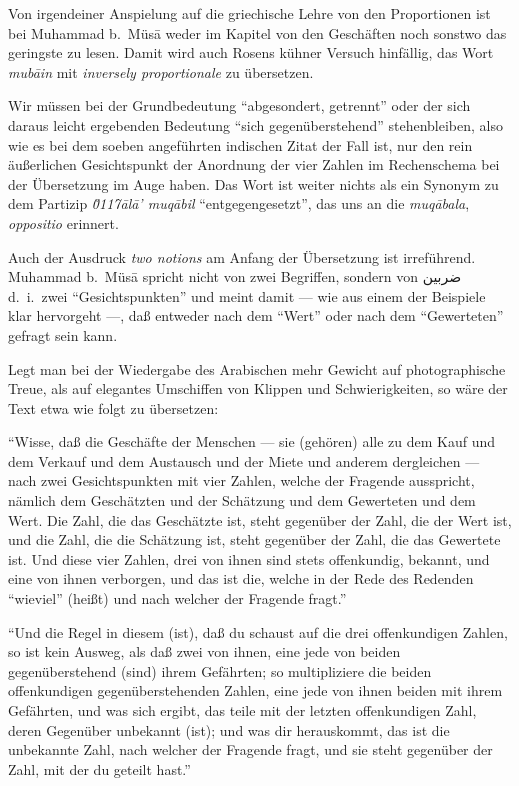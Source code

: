\documentclass[11pt,a4paper]{article}
\newcommand{\RL}[1]{\beginR#1\endR}
\newcommand{\ar}[1]{{\arabicfont\RL{#1}}}
\newcommand{\enquote}[1]{``#1''}
\begin{document}
Von irgendeiner Anspielung auf die griechische Lehre von den Proportionen ist bei Muhammad b.\ M\"us\=a weder im Kapitel von den Gesch\"aften noch sonstwo das geringste zu lesen. Damit wird auch Rosens k\"uhner Versuch hinf\"allig, das Wort \textit{mub\=ain} mit \textit{inversely proportionale} zu \"ubersetzen.

Wir m\"ussen bei der Grundbedeutung \enquote{abgesondert, getrennt} oder der sich daraus leicht ergebenden Bedeutung \enquote{sich gegen\"uberstehend} stehenbleiben, also wie es bei dem soeben angef\"uhrten indischen Zitat der Fall ist, nur den rein \"au\ss{}erlichen Gesichtspunkt der Anordnung der vier Zahlen im Rechenschema bei der \"Ubersetzung im Auge haben. Das Wort ist weiter nichts als ein Synonym zu dem Partizip \textit{\u0117\=al\=a' muq\=abil} \enquote{entgegengesetzt}, das uns an die \textit{muq\=abala}, \textit{oppositio} erinnert.

Auch der Ausdruck \textit{two notions} am Anfang der \"Ubersetzung ist irref\"uhrend. Muhammad b.\ M\"us\=a spricht nicht von zwei Begriffen, sondern von \ar{ضربين} d.\ i.\ zwei \enquote{Gesichtspunkten} und meint damit --- wie aus einem der Beispiele klar hervorgeht ---, da\ss{} entweder nach dem \enquote{Wert} oder nach dem \enquote{Gewerteten} gefragt sein kann.

Legt man bei der Wiedergabe des Arabischen mehr Gewicht auf photographische Treue, als auf elegantes Umschiffen von Klippen und Schwierigkeiten, so w\"are der Text etwa wie folgt zu \"ubersetzen:

\enquote{Wisse, da\ss{} die Gesch\"afte der Menschen --- sie (geh\"oren) alle zu dem Kauf und dem Verkauf und dem Austausch und der Miete und anderem dergleichen --- nach zwei Gesichtspunkten mit vier Zahlen, welche der Fragende ausspricht, n\"amlich dem Gesch\"atzten und der Sch\"atzung und dem Gewerteten und dem Wert. Die Zahl, die das Gesch\"atzte ist, steht gegen\"uber der Zahl, die der Wert ist, und die Zahl, die die Sch\"atzung ist, steht gegen\"uber der Zahl, die das Gewertete ist. Und diese vier Zahlen, drei von ihnen sind stets offenkundig, bekannt, und eine von ihnen verborgen, und das ist die, welche in der Rede des Redenden \enquote{wieviel} (hei\ss{}t) und nach welcher der Fragende fragt.}

\enquote{Und die Regel in diesem (ist), da\ss{} du schaust auf die drei offenkundigen Zahlen, so ist kein Ausweg, als da\ss{} zwei von ihnen, eine jede von beiden gegen\"uberstehend (sind) ihrem Gef\"ahrten; so multipliziere die beiden offenkundigen gegen\"uberstehenden Zahlen, eine jede von ihnen beiden mit ihrem Gef\"ahrten, und was sich ergibt, das teile mit der letzten offenkundigen Zahl, deren Gegen\"uber unbekannt (ist); und was dir herauskommt, das ist die unbekannte Zahl, nach welcher der Fragende fragt, und sie steht gegen\"uber der Zahl, mit der du geteilt hast.}
\end{document}
